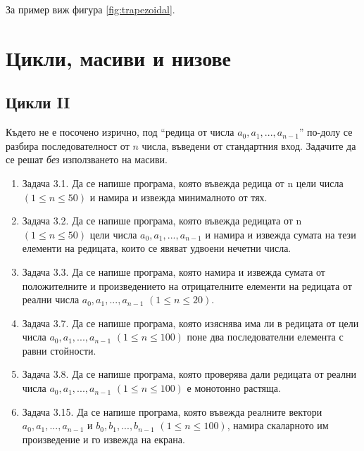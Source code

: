 {\begin{enumerate}[resume]
  За пример виж фигура \ref{fig:trapezoidal}.

\end{enumerate}


\clearpage\section {Цикли, масиви и низове}

\subsection {Цикли \textrm{II}}

Където не е посочено изрично, под ``редица от числа $a_0, a_1, ..., a_{n-1}$'' по-долу се разбира последователност от $n$ числа, въведени от стандартния вход. Задачите да се решат \emph{без} използването на масиви.


\begin{enumerate}[]


		\item Задача 3.1. \cite{sbornik} Да се напише програма, която въвежда редица от n цели числа $(1 \leq n \leq 50)$ и намира и извежда минималното от тях.

		\item Задача 3.2. \cite{sbornik} Да се напише програма, която въвежда редицата от n $(1 \leq n \leq 50)$ цели числа $a_0, a_1, ..., a_{n-1}$ и намира и извежда сумата на тези елементи на редицата, които се явяват удвоени нечетни числа.

		\item Задача 3.3. \cite{sbornik} Да се напише програма, която намира и извежда сумата от положителните и произведението на отрицателните елементи на редицата от реални числа $a_0, a_1, ..., a_{n-1}$ $(1 \leq n \leq 20)$.

		\item Задача 3.7. \cite{sbornik} Да се напише програма, която изяснява има ли в редицата от цели числа $a_0, a_1, ..., a_{n-1}$ $(1 \leq n \leq 100)$ поне два последователни елемента с равни стойности.

		\item Задача 3.8. \cite{sbornik} Да се напише програма, която проверява дали редицата от реални числа $a_0, a_1, ..., a_{n-1}$ $(1 \leq n \leq 100)$ е монотонно растяща.

    \item Задача 3.15. \cite{sbornik} Да се напише програма, която въвежда реалните вектори $a_0, a_1, ..., a_{n-1}$ и $b_0, b_1, ..., b_{n-1}$ $(1 \leq n \leq 100)$,  намира скаларното им произведение  и го извежда на екрана.


\end{enumerate}}
